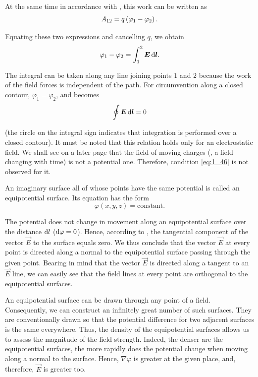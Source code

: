 \noindent
At the same time in accordance with , this work can be written as
\begin{equation*}
	A_{12} = q \left(\varphi_1 - \varphi_2\right).
\end{equation*}

\noindent
Equating these two expressions and cancelling $q$, we obtain
\begin{equation}\label{eq:1_45}
	\varphi_1 - \varphi_2 = \int_1^2 \boldsymbol{E}\, \mathrm{d}\boldsymbol{l}.
\end{equation}

\noindent
The integral can be taken along any line joining points $1$ and $2$ because the work of the field forces is independent of the path. For circumvention along a closed contour, $\varphi_1=\varphi_2$, and  becomes
\begin{equation}\label{eq:1_46}
	\oint \boldsymbol{E}\, \mathrm{d}\boldsymbol{l} = 0
\end{equation}

\noindent
(the circle on the integral sign indicates that integration is performed over a closed contour). It must be noted that this relation holds only for an electrostatic field. We shall see on a later page that the field of moving charges (\ie, a field changing with time) is not a potential one. Therefore, condition \eqref{eq:1_46} is not observed for it.

An imaginary surface all of whose points have the same potential is called an equipotential surface. Its equation has the form
\begin{equation*}
	\varphi(x,y,z) = \text{constant}.
\end{equation*}

\noindent
The potential does not change in movement along an equipotential surface over the distance $\mathrm{d} l$ ($\mathrm{d}\varphi=0$). Hence, according to , the tangential component of the vector $\vec{E}$ to the surface equals zero. We thus conclude that the vector $\vec{E}$ at every point is directed along a normal to the equipotential surface passing through the given point. Bearing in mind that the vector $\vec{E}$ is directed along a tangent to an $\vec{E}$ line, we can easily see that the field lines at every point are orthogonal to the equipotential surfaces.

An equipotential surface can be drawn through any point of a field. Consequently, we can construct an infinitely great number of such surfaces. They are conventionally drawn so that the potential difference for two adjacent surfaces is the same everywhere. Thus, the density of the equipotential surfaces allows us to assess the magnitude of the field strength. Indeed, the denser are the equipotential surfaces, the more rapidly does the potential change when moving along a normal to the surface. Hence, $\nabla\varphi$ is greater at the given place, and, therefore, $\vec{E}$ is greater too.

